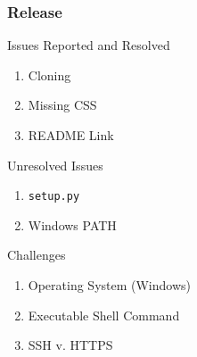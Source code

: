 \begin{frame}
	\centering
	\frametitle{Release}

	\begin{block}{Issues Reported and Resolved}
		\begin{enumerate}
			\item Cloning
			\item Missing CSS
			\item README Link
		\end{enumerate}
	\end{block}

	\pause

	\begin{block}{Unresolved Issues}
		\begin{enumerate}
      \item \texttt{setup.py}
      \item Windows PATH
		\end{enumerate}
	\end{block}

	\pause

	\begin{block}{Challenges}
		\begin{enumerate}
      \item Operating System (Windows)
			\item Executable Shell Command
			\item SSH v. HTTPS
		\end{enumerate}
	\end{block}

\end{frame}
